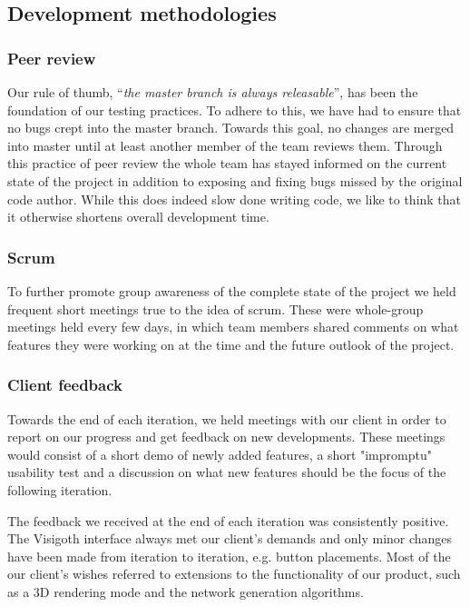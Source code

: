 \documentclass[a4paper,11pt,titlepage]{article}
\begin{document}
\subsection{Development methodologies}

\subsubsection{Peer review}
Our rule of thumb, ``\emph{the master branch is always releasable}'',
has been
the foundation of our testing practices. To adhere to this, we have
had to ensure that no bugs crept into the master branch. Towards this
goal, no changes are merged into master until at least another member
of the team reviews them. Through this practice of peer review the
whole team has stayed informed on the current state of the project
in addition to exposing and fixing bugs missed by the original code
author. While this does indeed slow done writing code, we like to
think that it otherwise shortens overall development time.

\subsubsection{Scrum}
To further promote group awareness of the complete state of the
project we held frequent short meetings true to the idea of scrum.
These were whole-group meetings held every few days, in which team
members shared comments on what features they were working on at
the time and the future outlook of the project.

\subsubsection{Client feedback}
Towards the end of each iteration, we held meetings with our client
in order to report on our progress and get feedback on new
developments. These meetings would consist of a short demo of newly
added features, a short "impromptu" usability test and a discussion
on what new features should be the focus of the following iteration.

The feedback we received at the end of each iteration was
consistently positive. The Visigoth interface always met our
client's demands and only minor changes have been made from
iteration to iteration, e.g. button placements. Most of the our
client's wishes referred to extensions to the functionality of
our product, such as a 3D rendering mode and the network generation
algorithms.
\end{document}
